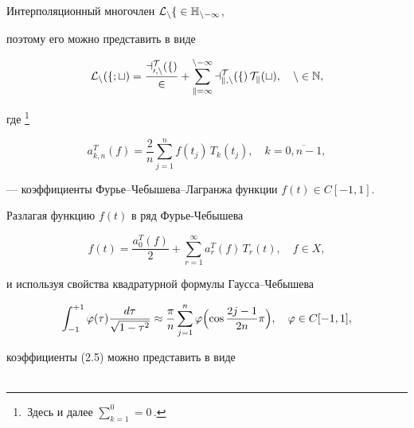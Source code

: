 \begin{pf}


Интерполяционный многочлен $\cal{L}_nf\in \Bbb{H}_{n-1} $,


поэтому его можно представить в виде


\begin{equation}


\cal{L}_n(f;t)=


\frac{a_{0,n}^T(f)}{2} + \sum_{k=1}^{n-1}a_{k,n}^T(f)\, T_k(t),


\quad n\in \Bbb{N},


\end{equation}


\addtocounter{footnote}{-1}




где \footnote{




\,Здесь и далее $\sum_{k=1}^0=0\, $.


}




\begin{equation}


a_{k,n}^T(f)=\frac{2}{n}\sum_{j=1}^nf(t_j)\, T_k(t_j),\quad k=\overline{0,n-1},


\end{equation}


--- коэффициенты Фурье--Чебышева--Лагранжа функции $f(t)\in C[-1,1]$.


Разлагая функцию $f(t)$ в ряд Фурье-Чебышева


\begin{equation}


f(t)= \frac{a_{0}^T(f)}{2} + \sum_{r=1}^{\infty }a_{r}^T(f)\, T_r(t),


\quad f\in X,


\end{equation}


и используя свойства квадратурной формулы Гаусса--Чебышева


$$


\int_{-1}^{+1}\varphi (\tau)\frac{d\tau }{\sqrt{1-\tau^2}} \approx


\frac{\pi }{n}\sum_{j=1}^n


\varphi \Bigl(\cos \frac{2j-1}{2n}\pi \Bigr),\quad \varphi \in C[-1,1] ,


$$


коэффициенты (2.5) можно представить в виде


\begin{align}



\end{align}
\end{pf}
